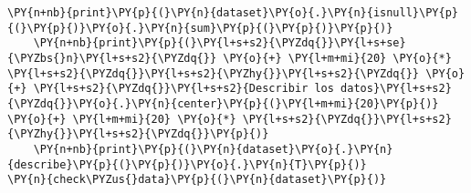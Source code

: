 \begin{tcolorbox}[breakable, size=fbox, boxrule=1pt, pad at break*=1mm,colback=cellbackground, colframe=cellborder]
\begin{Verbatim}[commandchars=\\\{\}]
    \PY{n+nb}{print}\PY{p}{(}\PY{n}{dataset}\PY{o}{.}\PY{n}{isnull}\PY{p}{(}\PY{p}{)}\PY{o}{.}\PY{n}{sum}\PY{p}{(}\PY{p}{)}\PY{p}{)}
    \PY{n+nb}{print}\PY{p}{(}\PY{l+s+s2}{\PYZdq{}}\PY{l+s+se}{\PYZbs{}n}\PY{l+s+s2}{\PYZdq{}} \PY{o}{+} \PY{l+m+mi}{20} \PY{o}{*} \PY{l+s+s2}{\PYZdq{}}\PY{l+s+s2}{\PYZhy{}}\PY{l+s+s2}{\PYZdq{}} \PY{o}{+} \PY{l+s+s2}{\PYZdq{}}\PY{l+s+s2}{Describir los datos}\PY{l+s+s2}{\PYZdq{}}\PY{o}{.}\PY{n}{center}\PY{p}{(}\PY{l+m+mi}{20}\PY{p}{)} \PY{o}{+} \PY{l+m+mi}{20} \PY{o}{*} \PY{l+s+s2}{\PYZdq{}}\PY{l+s+s2}{\PYZhy{}}\PY{l+s+s2}{\PYZdq{}}\PY{p}{)}
    \PY{n+nb}{print}\PY{p}{(}\PY{n}{dataset}\PY{o}{.}\PY{n}{describe}\PY{p}{(}\PY{p}{)}\PY{o}{.}\PY{n}{T}\PY{p}{)}
\PY{n}{check\PYZus{}data}\PY{p}{(}\PY{n}{dataset}\PY{p}{)}
\end{Verbatim}
\end{tcolorbox}

